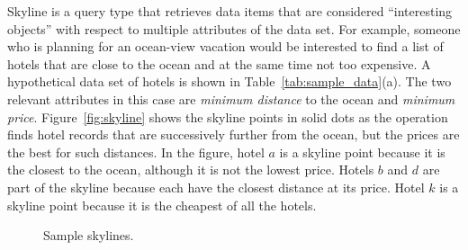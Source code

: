 
Skyline is a query type that retrieves data items that are
considered ``interesting objects'' with respect to multiple
attributes of the data set. For example, someone who is planning
for an ocean-view vacation would be interested to find a list of
hotels that are close to the ocean and at the same time not too
expensive. A hypothetical data set of hotels is shown in
Table~\ref{tab:sample_data}(a). The two relevant attributes in
this case are \emph{minimum distance} to the ocean and
\emph{minimum price}. Figure~\ref{fig:skyline} shows the skyline
points in solid dots as the operation finds hotel records that are
successively further from the ocean, but the prices are the best
for such distances. In the figure, hotel $a$ is a skyline point
because it is the closest to the ocean, although it is not the
lowest price. Hotels $b$ and $d$ are part of the skyline because
each have the closest distance at its price. Hotel $k$ is a
skyline point because it is the cheapest of all the hotels.

\begin{figure}[!h]
\centering {}  \vspace*{-5pt}\caption{Sample skylines.} \vspace*{-5pt}
\end{figure}

